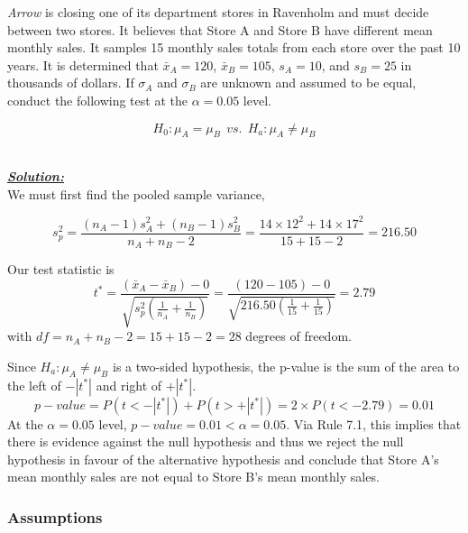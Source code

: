 \begin{example}
\textit{Arrow} is closing one of its department stores in Ravenholm and must decide between two stores. It believes that Store A and Store B have different mean monthly sales. It samples 15 monthly sales totals from each store over the past 10 years. It is determined that $\bar{x}_A = 120$, $\bar{x}_B=105$, $s_A = 10$, and $s_B=25$ in thousands of dollars. If $\sigma_A$ and $\sigma_B$ are unknown and assumed to be equal, conduct the following test at the $\alpha=0.05$ level. 

\[ H_0 : \mu_A = \mu_B ~~vs.~~ H_a : \mu_A \neq \mu_B \]


\hfill\\
{\emph{\textbf{\underline{Solution:}}}}\\

We must first find the pooled sample variance,

\[ s_p^{2} = \frac{(n_A-1)s_A^2 + (n_B-1)s_B^2}{n_A+n_B-2} = \frac{14 \times 12^2 + 14 \times 17^2}{15+15-2} = 216.50\]

Our test statistic is 
\[ t^{*} =\frac{(\bar{x}_A - \bar{x}_B)-0}{\sqrt{s_p^2 \left(\frac{1}{n_A} + \frac{1}{n_B}\right)}} = \frac{(120-105)-0}{\sqrt{216.50\left(\frac{1}{15}+\frac{1}{15}\right)}}=2.79 \]
with $df=n_A+n_B-2=15+15-2=28$ degrees of freedom. 

Since $H_a: \mu_A \neq \mu_B$ is a two-sided hypothesis, the p-value is the sum of the area to the left of $-|t^{*}|$ and right of $+|t^{*}|$. 
\[ p-value = P(t<-|t^{*}|)+P(t>+|t^{*}|) = 2 \times P(t < -2.79) = 0.01\]
At the $\alpha=0.05$ level, $p-value = 0.01 < \alpha = 0.05$. Via Rule 7.1, this implies that there is evidence against the null hypothesis and thus we reject the null hypothesis in favour of the alternative hypothesis and conclude that Store A's mean monthly sales are not equal to Store B's mean monthly sales. 

\end{example}




\subsubsection{Assumptions}


